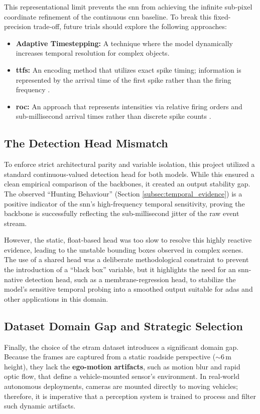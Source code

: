 This representational limit prevents the \gls{snn} from achieving the infinite sub-pixel coordinate refinement of the continuous \gls{cnn} baseline. To break this fixed-precision trade-off, future trials should explore the following approaches:
\begin{itemize}
    \item \textbf{Adaptive Timestepping:} A technique where the model dynamically increases temporal resolution for complex objects.
    \item \textbf{\gls{ttfs}:} An encoding method that utilizes exact spike timing; information is represented by the arrival time of the first spike rather than the firing frequency \cite{ttfs_encoding}.
    \item \textbf{\gls{roc}:} An approach that represents intensities via relative firing orders and sub-millisecond arrival times rather than discrete spike counts \cite{THORPE2001715}.
\end{itemize}   

\subsection{The Detection Head Mismatch}
To enforce strict architectural parity and variable isolation, this project utilized a standard continuous-valued detection head for both models. 
While this ensured a clean empirical comparison of the backbones, it created an output stability gap. The observed ``Hunting Behaviour'' (Section \ref{subsec:temporal_evidence}) is a positive indicator of the \gls{snn}'s high-frequency temporal sensitivity, proving the backbone is successfully reflecting the sub-millisecond jitter of the raw event stream.

However, the static, float-based head was too slow to resolve this highly reactive evidence, leading to the unstable bounding boxes observed in complex scenes. 
The use of a shared head was a deliberate methodological constraint to prevent the introduction of a ``black box'' variable, but it highlights the need for an \gls{snn}-native detection head, such as a membrane-regression head, to stabilize the model's sensitive temporal probing into a smoothed output suitable for \gls{adas} and other applications in this domain.

\subsection{Dataset Domain Gap and Strategic Selection}
Finally, the choice of the \gls{etram} dataset \parencite{Verma_2024_CVPR} introduces a significant domain gap. 
Because the frames are captured from a static roadside perspective ($\sim$6\,m height), they lack the \textbf{ego-motion artifacts}, such as motion blur and rapid optic flow, that define a vehicle-mounted sensor's environment. In real-world autonomous deployments, cameras are mounted directly to moving vehicles; therefore, it is imperative that a perception system is trained to process and filter such dynamic artifacts.

